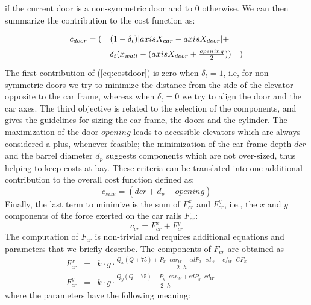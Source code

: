 if the current door is a non-symmetric door and to $0$ otherwise.
We can then summarize the contribution to the cost function as:
\begin{equation}
	\label{eq:costdoor}
	\renewcommand{\arraystretch}{1.5}
	\begin{array}{lll}
		c_{door} = ( & (1 - \delta_{t})|axisX_{car} - axisX_{door}| + \\
		& \delta_{t}(x_{wall} - (axisX_{door} + \frac{opening}{2})) &)
	\end{array}
\end{equation}
The first contribution of (\ref{eq:costdoor}) is zero when $\delta_t = 1$, 
i.e, for non-symmetric doors we try to minimize the distance from 
the side of the elevator opposite to the car frame, whereas
when $\delta_t = 0$ we try to align the door and the car axes.
The third objective is related to the selection of the components, and
gives the guidelines for sizing the car frame, the doors and the cylinder.
The maximization of the door $opening$ leads to accessible elevators which 
are always considered a plus, whenever feasible; the minimization of the
car frame depth $dcr$ and the barrel diameter $d_p$ suggests components 
which are not over-sized, thus helping to keep costs at bay. These criteria 
can be translated into one additional contribution to the overall cost 
function defined as:
\begin{equation}
	\label{eq:choice}
	c_{size} = (dcr + d_{p} - opening)
\end{equation}
Finally, the last term to minimize is the sum of $F^x_{cr}$
and $F^y_{cr}$, i.e., the $x$ and $y$ components of
the force exerted on the car rails $F_{cr}$:
\begin{equation}
	\label{eq:cr}
	c_{cr} = F^x_{cr} + F^y_{cr}
\end{equation}
The computation of $F_{cr}$ is non-trivial and requires additional
equations and parameters that we briefly describe.
The components of $F_{cr}$ are obtained as
\begin{equation*}
	\label{eq:force}
	\begin{array}{rcl}
		F^x_{cr} & = & k \cdot g \cdot
		\frac{Q_x (Q + 75) + P_x \cdot car_W + cdP_x \cdot cd_W + cf_W 
			\cdot CF_x}{2 \cdot h}\\
		F^y_{cr} & = & k \cdot g \cdot
		\frac{Q_y (Q + 75) + P_y \cdot car_W + cdP_y \cdot cd_W}
		{2 \cdot h}
	\end{array}
\end{equation*}
where the parameters have the following meaning:
